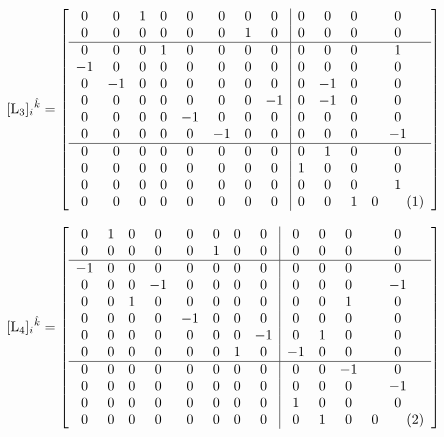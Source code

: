 \documentclass[12pt]{article}
\newcommand\numberthis{\addtocounter{equation}{1}\tag{\theequation}}
\let\bm\relax
\newcommand{\bm}[1]{{\boldsymbol{#1}}}
\begin{document}
\[
[{\bm{\rm L}_3}]_{i}{}^{\hat k}  = \left[\begin{array}{cccccccc|cccc}
    0 & 0 & 1 & 0 & 0 & 0 & 0 & 0 & 0 & 0 & 0 & 0 \\ 
    0 & 0 & 0 & 0 & 0 & 0 & 1 & 0 & 0 & 0 & 0 & 0 \\
    \hline
    0 & 0 & 0 & 1 & 0 & 0 & 0 & 0 & 0 & 0 & 0 & 1 \\ 
    -1 & 0 & 0 & 0 & 0 & 0 & 0 & 0 & 0 & 0 & 0 & 0 \\ 
    0 & -1 & 0 & 0 & 0 & 0 & 0 & 0 & 0 & -1 & 0 & 0 \\ 
    0 & 0 & 0 & 0 & 0 & 0 & 0 & -1 & 0 & -1 & 0 & 0 \\ 
    0 & 0 & 0 & 0 & -1 & 0 & 0 & 0 & 0 & 0 & 0 & 0 \\ 
    0 & 0 & 0 & 0 & 0 & -1 & 0 & 0 & 0 & 0 & 0 & -1 \\ 
    \hline
    0 & 0 & 0 & 0 & 0 & 0 & 0 & 0 & 0 & 1 & 0 & 0 \\ 
    0 & 0 & 0 & 0 & 0 & 0 & 0 & 0 & 1 & 0 & 0 & 0 \\ 
    0 & 0 & 0 & 0 & 0 & 0 & 0 & 0 & 0 & 0 & 0 & 1 \\ 
    0 & 0 & 0 & 0 & 0 & 0 & 0 & 0 & 0 & 0 & 1 & 0
\numberthis\end{array}\right] \]

\[
[{\bm{\rm L}_4}]_{i}{}^{\hat k}  = \left[\begin{array}{cccccccc|cccc}
    0 & 1 & 0 & 0 & 0 & 0 & 0 & 0 & 0 & 0 & 0 & 0 \\ 
    0 & 0 & 0 & 0 & 0 & 1 & 0 & 0 & 0 & 0 & 0 & 0 \\
    \hline
    -1 & 0 & 0 & 0 & 0 & 0 & 0 & 0 & 0 & 0 & 0 & 0 \\ 
    0 & 0 & 0 & -1 & 0 & 0 & 0 & 0 & 0 & 0 & 0 & -1 \\ 
    0 & 0 & 1 & 0 & 0 & 0 & 0 & 0 & 0 & 0 & 1 & 0 \\ 
    0 & 0 & 0 & 0 & -1 & 0 & 0 & 0 & 0 & 0 & 0 & 0 \\ 
    0 & 0 & 0 & 0 & 0 & 0 & 0 & -1 & 0 & 1 & 0 & 0 \\ 
    0 & 0 & 0 & 0 & 0 & 0 & 1 & 0 & -1 & 0 & 0 & 0 \\ 
    \hline
    0 & 0 & 0 & 0 & 0 & 0 & 0 & 0 & 0 & 0 & -1 & 0 \\ 
    0 & 0 & 0 & 0 & 0 & 0 & 0 & 0 & 0 & 0 & 0 & -1 \\ 
    0 & 0 & 0 & 0 & 0 & 0 & 0 & 0 & 1 & 0 & 0 & 0 \\ 
    0 & 0 & 0 & 0 & 0 & 0 & 0 & 0 & 0 & 1 & 0 & 0
\numberthis\end{array}\right] 
\label{eq6.4}\]
\end{document}
